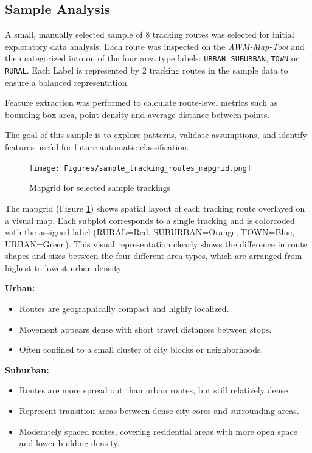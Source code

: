 \documentclass[a4paper,12pt,twoside]{scrreprt}
\begin{document}
\subsection{Sample Analysis}

A small, manually selected sample of 8 tracking routes was selected for initial
exploratory data analysis. Each route was inspected on the
\textit{AWM-Map-Tool} and
then categorized into on of the four area type labels: \texttt{URBAN},
\texttt{SUBURBAN}, \texttt{TOWN} or \texttt{RURAL}. Each Label is represented
by 2 tracking routes in the sample data to
ensure a balanced representation.

Feature extraction was performed to calculate route-level metrics such as
bounding box area, point density and average
distance between points.

The goal of this sample is to explore patterns, validate assumptions, and
identify features useful for future automatic classification.

\begin{figure}[htbp]
  \centering

  \texttt{[image: Figures/sample\_tracking\_routes\_mapgrid.png]}
  \caption{Mapgrid for selected sample trackings}
  \label{fig:sample_mapgrid}
\end{figure}
\FloatBarrier
The mapgrid (Figure \ref{fig:sample_mapgrid}) shows spatial layout of each
tracking route overlayed on a visual
map. Each subplot corresponds to a single tracking and is colorcoded with the
assigned label (RURAL=Red, SUBURBAN=Orange, TOWN=Blue, URBAN=Green). This
visual representation clearly shows the difference in route shapes and sizes
between the four different area types, which are arranged from highest to
lowest urban density.

\textbf{Urban:}
\begin{itemize}
  \item Routes are geographically compact and highly localized.
  \item Movement appears dense with short travel distances between stops.
  \item Often confined to a small cluster of city blocks or neighborhoods.
\end{itemize}

\textbf{Suburban:}
\begin{itemize}
  \item Routes are more spread out than urban routes, but still relatively
        dense.
  \item Represent transition areas between dense city cores and surrounding
        areas.
  \item Moderately spaced routes, covering residential areas with more open
        space and lower building density.
\end{itemize}
\end{document}
